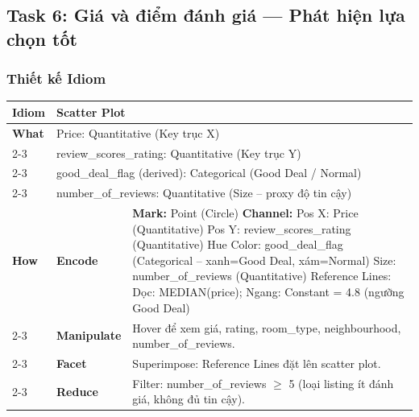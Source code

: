 \subsection{Task 6: Giá và điểm đánh giá --- Phát hiện lựa chọn tốt}

\subsubsection{Thiết kế Idiom}

\begin{table}[H]
\centering
\renewcommand{\arraystretch}{1.1}
\begin{tabularx}{\textwidth}{|l|l|X|}
\hline
\textbf{Idiom} & \multicolumn{2}{l|}{\textbf{Scatter Plot}} \\ \hline
\textbf{What}
& \multicolumn{2}{X|}{Price: Quantitative (Key trục X)} \\ \cline{2-3}
& \multicolumn{2}{X|}{review\_scores\_rating: Quantitative (Key trục Y)} \\ \cline{2-3}
& \multicolumn{2}{X|}{good\_deal\_flag (derived): Categorical (Good Deal / Normal)} \\ \cline{2-3}
& \multicolumn{2}{X|}{number\_of\_reviews: Quantitative (Size -- proxy độ tin cậy)} \\ \hline
\textbf{How}
& \textbf{Encode} &
\textbf{Mark:} Point (Circle) \newline
\textbf{Channel:} \newline
\hspace*{1em} Pos X: Price (Quantitative) \newline
\hspace*{1em} Pos Y: review\_scores\_rating (Quantitative) \newline
\hspace*{1em} Hue Color: good\_deal\_flag (Categorical -- xanh=Good Deal, xám=Normal) \newline
\hspace*{1em} Size: number\_of\_reviews (Quantitative) \newline
Reference Lines: Dọc: MEDIAN(price); Ngang: Constant = 4.8 (ngưỡng Good Deal) \\ \cline{2-3}
& \textbf{Manipulate} &
Hover để xem giá, rating, room\_type, neighbourhood, number\_of\_reviews. \\ \cline{2-3}
& \textbf{Facet} &
Superimpose: Reference Lines đặt lên scatter plot. \\ \cline{2-3}
& \textbf{Reduce} &
Filter: number\_of\_reviews $\geq$ 5 (loại listing ít đánh giá, không đủ tin cậy). \\ \hline

\end{tabularx}
\end{table}
